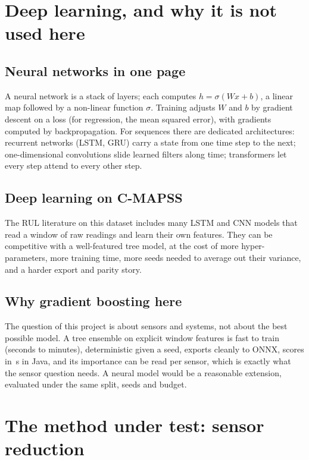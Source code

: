 \documentclass[11pt,a4paper]{article}
\begin{document}
\section{Deep learning, and why it is not used here}

\subsection{Neural networks in one page}
A neural network is a stack of layers; each computes $h = \sigma(Wx + b)$, a linear map followed by a
non-linear function $\sigma$. Training adjusts $W$ and $b$ by gradient descent on a loss (for regression, the
mean squared error), with gradients computed by backpropagation. For sequences there are dedicated
architectures: recurrent networks (LSTM, GRU) carry a state from one time step to the next; one-dimensional
convolutions slide learned filters along time; transformers let every step attend to every other step.

\subsection{Deep learning on C-MAPSS}
The RUL literature on this dataset includes many LSTM and CNN models that read a window of raw readings
and learn their own features. They can be competitive with a well-featured tree model, at the cost of more
hyper-parameters, more training time, more seeds needed to average out their variance, and a harder export and
parity story.

\subsection{Why gradient boosting here}
The question of this project is about sensors and systems, not about the best possible model. A tree ensemble
on explicit window features is fast to train (seconds to minutes), deterministic given a seed, exports cleanly
to ONNX, scores in \JavaUsPerPrediction{}\,\textmu s in Java, and its importance can be read per sensor, which
is exactly what the sensor question needs. A neural model would be a reasonable extension, evaluated under the
same split, seeds and budget.

\section{The method under test: sensor reduction}
\end{document}
